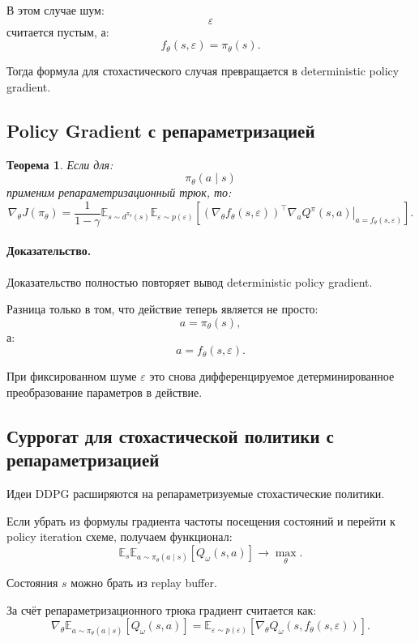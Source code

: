 \documentclass[12pt,a4paper]{article}
\newtheorem{theorem}{Теорема}
\begin{document}
В этом случае шум:
\[
\varepsilon
\]
считается пустым, а:
\[
f_\theta(s,\varepsilon)
=
\pi_\theta(s).
\]

Тогда формула для стохастического случая превращается в deterministic policy gradient.

\subsection{Policy Gradient с репараметризацией}

\begin{theorem}
Если для:
\[
\pi_\theta(a\mid s)
\]
применим репараметризационный трюк, то:
\[
\nabla_\theta J(\pi_\theta)
=
\frac{1}{1-\gamma}
\mathbb E_{s\sim d^{\pi_\theta}(s)}
\mathbb E_{\varepsilon\sim p(\varepsilon)}
\left[
\left(
\nabla_\theta f_\theta(s,\varepsilon)
\right)^\top
\left.
\nabla_a Q^\pi(s,a)
\right|_{a=f_\theta(s,\varepsilon)}
\right].
\]
\end{theorem}

\paragraph{Доказательство.}

Доказательство полностью повторяет вывод deterministic policy gradient.

Разница только в том, что действие теперь является не просто:
\[
a=\pi_\theta(s),
\]
а:
\[
a=f_\theta(s,\varepsilon).
\]

При фиксированном шуме $\varepsilon$ это снова дифференцируемое детерминированное преобразование параметров в действие.

\subsection{Суррогат для стохастической политики с репараметризацией}

Идеи DDPG расширяются на репараметризуемые стохастические политики.

Если убрать из формулы градиента частоты посещения состояний и перейти к policy iteration схеме, получаем функционал:
\[
\mathbb E_s
\mathbb E_{a\sim\pi_\theta(a\mid s)}
\left[
Q_\omega(s,a)
\right]
\to
\max_\theta.
\]

Состояния $s$ можно брать из replay buffer.

За счёт репараметризационного трюка градиент считается как:
\[
\nabla_\theta
\mathbb E_{a\sim\pi_\theta(a\mid s)}
\left[
Q_\omega(s,a)
\right]
=
\mathbb E_{\varepsilon\sim p(\varepsilon)}
\left[
\nabla_\theta
Q_\omega
\left(
s,
f_\theta(s,\varepsilon)
\right)
\right].
\]
\end{document}
